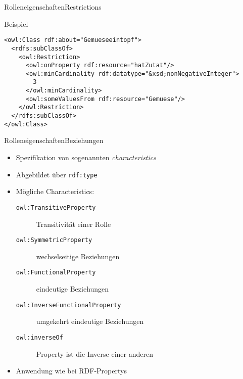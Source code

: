 \documentclass{beamer}
\begin{document}
\begin{frame}[fragile]{Rolleneigenschaften}{Restrictions}
\begin{exampleblock}{Beispiel}
\begin{lstlisting}[lang="xml"]
<owl:Class rdf:about="Gemueseeintopf">
  <rdfs:subClassOf>
    <owl:Restriction>
      <owl:onProperty rdf:resource="hatZutat"/>
      <owl:minCardinality rdf:datatype="&xsd;nonNegativeInteger">
        3
      </owl:minCardinality>
      <owl:someValuesFrom rdf:resource="Gemuese"/>
    </owl:Restriction>
  </rdfs:subClassOf>
</owl:Class>
\end{lstlisting}
\end{exampleblock}
\end{frame}


%
\begin{frame}[fragile]{Rolleneigenschaften}{Beziehungen}
\begin{itemize}
\item Spezifikation von sogenannten \emph{characteristics}
\item Abgebildet über \texttt{rdf:type}
\item Mögliche Characteristics:
\begin{description}
\item[\texttt{owl:TransitiveProperty}] Transitivität einer Rolle
\item[\texttt{owl:SymmetricProperty}] wechselseitige Beziehungen
\item[\texttt{owl:FunctionalProperty}] eindeutige Beziehungen
\item[\texttt{owl:InverseFunctionalProperty}] umgekehrt eindeutige Beziehungen
\item[\texttt{owl:inverseOf}] Property ist die Inverse einer anderen 


\end{description}
\item Anwendung wie bei RDF-Propertys
\end{itemize}
\end{frame}

\end{document}
